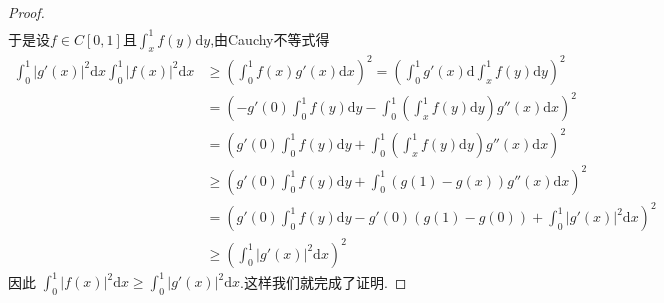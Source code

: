 \documentclass[../../main.tex]{subfiles}%
\begin{document}
\begin{proof}
\begin{align*}
\end{align*}
于是设$f\in C\left[ 0,1 \right]\text{且}\int_x^1{f\left( y \right) \mathrm{d}y}$,由Cauchy不等式得
\begin{align*}
\int_0^1 |g'(x)|^2 \mathrm{d}x \int_0^1 |f(x)|^2 \mathrm{d}x &\geqslant \left( \int_0^1 f(x) g'(x) \mathrm{d}x \right)^2 = \left( \int_0^1 g'(x) \mathrm{d} \int_x^1 f(y) \mathrm{d}y \right)^2 \\
&= \left( -g'(0) \int_0^1 f(y) \mathrm{d}y - \int_0^1 \left( \int_x^1 f(y) \mathrm{d}y \right) g''(x) \mathrm{d}x \right)^2 \\
&= \left( g'(0) \int_0^1 f(y) \mathrm{d}y + \int_0^1 \left( \int_x^1 f(y) \mathrm{d}y \right) g''(x) \mathrm{d}x \right)^2 \\
&\geqslant \left( g'(0) \int_0^1 f(y) \mathrm{d}y + \int_0^1 (g(1) - g(x)) g''(x) \mathrm{d}x \right)^2 \\
&= \left( g'(0) \int_0^1 f(y) \mathrm{d}y - g'(0) (g(1) - g(0)) + \int_0^1 |g'(x)|^2 \mathrm{d}x \right)^2 \\
&\geqslant \left( \int_0^1 |g'(x)|^2 \mathrm{d}x \right)^2
\end{align*}
因此 $\int_0^1 |f(x)|^2 \mathrm{d}x \geqslant \int_0^1 |g'(x)|^2 \mathrm{d}x$.这样我们就完成了证明.

\end{proof}
\end{document}
